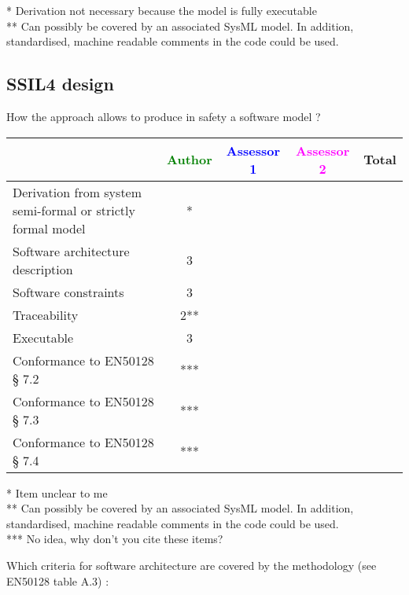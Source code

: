 \begin{author_comment}
* Derivation not necessary because the model is fully executable\\
** Can possibly be covered by an associated SysML model. In addition, standardised, machine readable comments in the code could be used.\\
\end{author_comment}

\subsection{SSIL4 design}

How the approach allows to  produce in safety a software model ?

\begin{tabular}{|l | c | c | c | c|}
\hline
& \textcolor{green}{Author} & \textcolor{blue}{Assessor 1} & \textcolor{magenta}{Assessor 2} & Total \\
\hline
Derivation from system semi-formal or strictly formal model  &* & & &  \\
\hline 
Software architecture description  &3 & & &  \\
\hline
Software constraints  &3 & & &  \\
\hline
Traceability  &2** & & &  \\
\hline
Executable  &3 & & &  \\
\hline
Conformance to EN50128 § 7.2  &*** & & &  \\
\hline
Conformance to EN50128 § 7.3  &*** & & &  \\
\hline
Conformance to EN50128 § 7.4  &*** & & &  \\
\hline
\end{tabular}

\begin{author_comment}
* Item unclear to me\\
** Can possibly be covered by an associated SysML model. In addition, standardised, machine readable comments in the code could be used.\\
*** No idea, why don't you cite these items?
\end{author_comment}

Which criteria for software architecture are covered by the methodology
(see EN50128 table A.3) :

